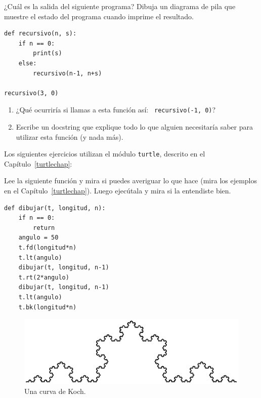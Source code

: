 \documentclass[10pt]{book}
\begin{document}
\begin{exercise}
¿Cuál es la salida del siguiente programa?
Dibuja un diagrama de pila que muestre el estado del programa
cuando imprime el resultado.

\begin{verbatim}
def recursivo(n, s):
    if n == 0:
        print(s)
    else:
        recursivo(n-1, n+s)

recursivo(3, 0)
\end{verbatim}

\begin{enumerate}

\item ¿Qué ocurriría si llamas a esta función así: {\tt
  recursivo(-1, 0)}?

\item Escribe un docstring que explique todo lo que alguien necesitaría
  saber para utilizar esta función (y nada más).

\end{enumerate}

\end{exercise}


Los siguientes ejercicios utilizan el módulo {\tt turtle}, descrito en el
Capítulo~\ref{turtlechap}:

\begin{exercise}

Lee la siguiente función y mira si puedes averiguar
lo que hace (mira los ejemplos en el Capítulo~\ref{turtlechap}).  Luego ejecútala
y mira si la entendiste bien.

\begin{verbatim}
def dibujar(t, longitud, n):
    if n == 0:
        return
    angulo = 50
    t.fd(longitud*n)
    t.lt(angulo)
    dibujar(t, longitud, n-1)
    t.rt(2*angulo)
    dibujar(t, longitud, n-1)
    t.lt(angulo)
    t.bk(longitud*n)
\end{verbatim}

\end{exercise}


\begin{figure}
\centerline
{\includegraphics[scale=0.8]{figs/koch.pdf}}
\caption{Una curva de Koch.}
\label{fig.koch}
\end{figure}
\end{document}

